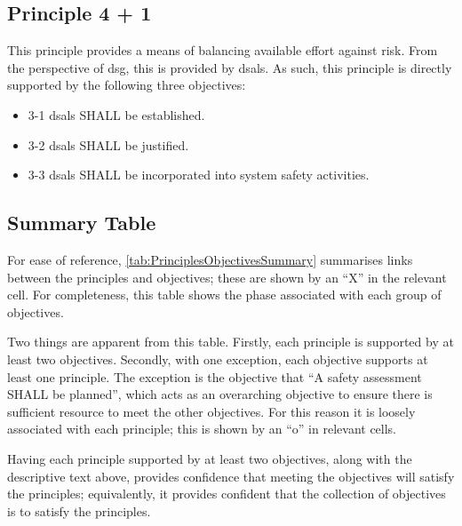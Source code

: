 \subsection{Principle 4 + 1}

This principle provides a means of balancing available effort against risk. From the perspective of \gls{dsg}, this is provided by \glspl{dsal}. As such, this principle is directly supported by the following three objectives:

\begin{itemize}
	\item \textcolor{dsiwgAccentColour}{3-1} \Glspl{dsal} SHALL be established.
	\item \textcolor{dsiwgAccentColour}{3-2} \Glspl{dsal} SHALL be justified.
	\item \textcolor{dsiwgAccentColour}{3-3} \Glspl{dsal} SHALL be incorporated into system safety activities.
\end{itemize}


\subsection{Summary Table}

For ease of reference, \autoref{tab:PrinciplesObjectivesSummary} summarises links between the principles and objectives; these are shown by an ``X'' in the relevant cell. For completeness, this table shows the phase associated with each group of objectives. 

Two things are apparent from this table. Firstly, each principle is supported by at least two objectives. Secondly, with one exception, each objective supports at least one principle. The exception is the objective that ``A \gls{safety assessment} SHALL be planned'', which acts as an overarching objective to ensure there is sufficient resource to meet the other objectives. For this reason it is loosely associated with each principle; this is shown by an ``o'' in relevant cells.

Having each principle supported by at least two objectives, along with the descriptive text above, provides confidence that meeting the objectives will satisfy the principles; equivalently, it provides confident that the collection of objectives is  to satisfy the principles. 

